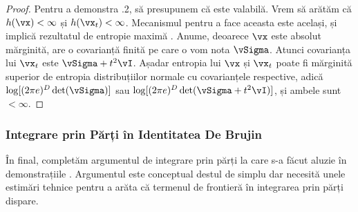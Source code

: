 \documentclass[../../book-main_ro.tex]{subfiles}
\begin{document}
\begin{proof}
    Pentru a demonstra .2, să presupunem că  este valabilă. Vrem să arătăm că \(h(\vx) < \infty\) și \(h(\vx_{t}) < \infty\). Mecanismul pentru a face aceasta este același, și implică rezultatul de entropie maximă . Anume, deoarece \(\vx\) este absolut mărginită, are o covarianță finită pe care o vom nota \(\vSigma\). Atunci covarianța lui \(\vx_{t}\) este \(\vSigma + t^{2}\vI\). Așadar entropia lui \(\vx\) și \(\vx_{t}\) poate fi mărginită superior de entropia distribuțiilor normale cu covarianțele respective, adică \(\log[(2\pi e)^{D}\det(\vSigma)]\) sau \(\log[(2\pi e)^{D}\det(\vSigma + t^{2}\vI)]\), și ambele sunt \(< \infty\).
\end{proof}

\subsubsection{Integrare prin Părți în Identitatea De Brujin}

În final, completăm argumentul de integrare prin părți la care s-a făcut aluzie în demonstrațiile . Argumentul este conceptual destul de simplu dar necesită unele estimări tehnice pentru a arăta că termenul de frontieră în integrarea prin părți dispare.
\end{document}
